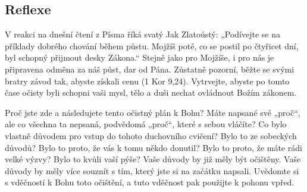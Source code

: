 \documentclass[11pt]{article}
\begin{document}
\subsection*{Reflexe}
V reakci na dnešní čtení z Písma říká svatý Jak Zlatoústý: „Podívejte se na příklady dobrého chování během
půstu. Mojžíš poté, co se postil po čtyřicet dní, byl schopný přijmout desky Zákona.“ Stejně jako pro
Mojžíše, i pro nás je připravena odměna za náš půst, dar od Pána. Zůstatně pozorní, běžte se svými bratry
závod tak, abyste získali cenu (1 Kor 9,24). Vytrvejte, abyste po tomto čase očisty byli schopni vaši mysl,
tělo a duši nechat ovládnout Božím zákonem.

Proč jste zde a následujete tento očistný plán k Bohu? Máte napsané své „proč“, ale co všechna ta nepsaná,
podvědomá „proč“, které s sebou vláčíte? Co bylo vlastně důvodem pro vstup do tohoto duchovního cvičení?
Bylo to ze sobeckých důvodů? Bylo to proto, že vás k tomu někdo donutil? Bylo to proto, že máte rádi velké
výzvy? Bylo to kvůli vaší pýše? Vaše důvody by již měly být očištěny. Vaše důvody by měly více souznít
s tím, který jste si na začátku napsali. Uvědomte si s vděčností k Bohu toto očištění, a tuto vděčnost pak
použijte k pohonu vpřed.
\end{document}
